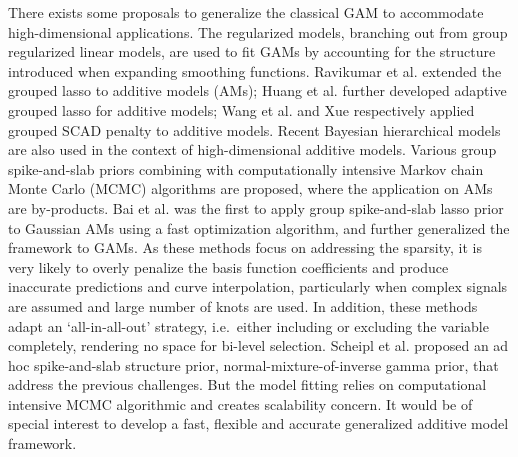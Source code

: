 \documentclass[AMA,STIX1COL,]{WileyNJD-v2}
\begin{document}
There exists some proposals to generalize the classical GAM to
accommodate high-dimensional applications. The regularized models,
branching out from group regularized linear models, are used to fit GAMs
by accounting for the structure introduced when expanding smoothing
functions. Ravikumar et al. \citep{Ravikumar2009} extended the grouped
lasso \citep{Yuan2006} to additive models (AMs); Huang et al.
\citep{Huang2010} further developed adaptive grouped lasso for additive
models; Wang et al. \citep{Wang2007} and Xue \citep{Xue2009}
respectively applied grouped SCAD penalty \citep{Fan2001} to additive
models. Recent Bayesian hierarchical models are also used in the context
of high-dimensional additive models. Various group spike-and-slab priors
combining with computationally intensive Markov chain Monte Carlo (MCMC)
algorithms \citep{Xu2015, Yang2020} are proposed, where the application
on AMs are by-products. Bai et al. \citep{Bai2020} was the first to
apply group spike-and-slab lasso prior to Gaussian AMs using a fast
optimization algorithm, and further generalized the framework to
GAMs\citep{Bai2021}. As these methods focus on addressing the sparsity,
it is very likely to overly penalize the basis function coefficients and
produce inaccurate predictions and curve interpolation, particularly
when complex signals are assumed and large number of knots are used.
\citep{Scheipl2013} In addition, these methods adapt an `all-in-all-out'
strategy, i.e.~either including or excluding the variable completely,
rendering no space for bi-level selection. Scheipl et al.
\citep{Scheipl2012} proposed an ad hoc spike-and-slab structure prior,
normal-mixture-of-inverse gamma prior, that address the previous
challenges. But the model fitting relies on computational intensive MCMC
algorithmic and creates scalability concern. It would be of special
interest to develop a fast, flexible and accurate generalized additive
model framework.
\end{document}
